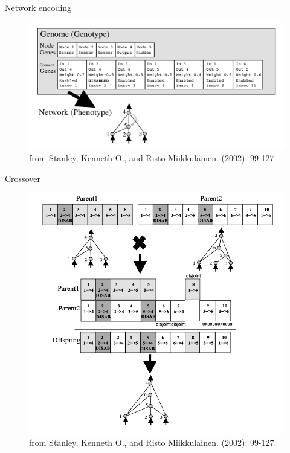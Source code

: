 \documentclass{beamer}
\begin{document}
\begin{frame}{ Network encoding}
  \begin{block}{}
\begin{figure}[htbp]
  \includegraphics[width = \textwidth,left]{genome}
  \caption{ \tiny from Stanley, Kenneth O., and Risto Miikkulainen. (2002): 99-127.}
\end{figure}
\end{block}
\end{frame}



\begin{frame}{Crossover}
  \begin{block}{}
    \begin{figure}[htbp]
     \includegraphics[width = .6\textwidth]{crossover}
     \caption{ \tiny from Stanley, Kenneth O., and Risto Miikkulainen. (2002): 99-127.}
    \end{figure}
    \end{block}
\end{frame}
\end{document}
